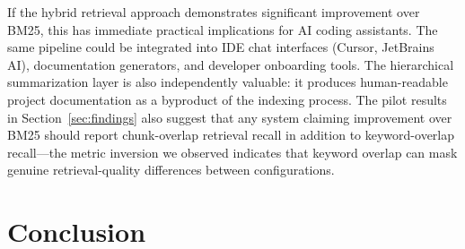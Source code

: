 \documentclass[11pt]{article}
\begin{document}
If the hybrid retrieval approach demonstrates significant improvement over BM25, this has immediate practical implications for AI coding assistants. The same pipeline could be integrated into IDE chat interfaces (Cursor, JetBrains AI), documentation generators, and developer onboarding tools. The hierarchical summarization layer is also independently valuable: it produces human-readable project documentation as a byproduct of the indexing process. The pilot results in Section~\ref{sec:findings} also suggest that any system claiming improvement over BM25 should report chunk-overlap retrieval recall in addition to keyword-overlap recall---the metric inversion we observed indicates that keyword overlap can mask genuine retrieval-quality differences between configurations.

\section{Conclusion}
\end{document}
